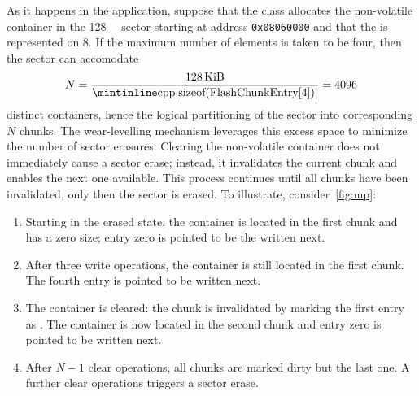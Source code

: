 As it happens in the application, suppose that the class allocates the non-volatile container in the \qty{128}{\kibi\byte} sector starting at address \texttt{0x08060000} and that the  is represented on \qty{8}{\byte}. If the maximum number of elements is taken to be four, then the sector can accomodate
\[
    N = \frac{\qty{128}{\kibi\byte}}{\text{\icpp{sizeof(FlashChunkEntry[4])}}} = 4096
\]
distinct containers, hence the logical partitioning of the sector into corresponding $N$ chunks. The wear-levelling mechanism leverages this excess space to minimize the number of sector erasures. Clearing the non-volatile container does not immediately cause a sector erase; instead, it invalidates the current chunk and enables the next one available. This process continues until all chunks have been invalidated, only then the sector is erased. To illustrate, consider~\cref{fig:mp}:
\begin{enumerate}[label=\textbf{(\alph*)}]
    \item Starting in the erased state, the container is located in the first chunk and has a zero size; entry zero is pointed to be the written next.
    \item After three write operations, the container is still located in the first chunk. The fourth entry is pointed to be written next.
    \item The container is cleared: the chunk is invalidated by marking the first entry as . The container is now located in the second chunk and entry zero is pointed to be written next.
    \item After $N-1$ clear operations, all chunks are marked dirty but the last one. A further clear operations triggers a sector erase.
\end{enumerate}


